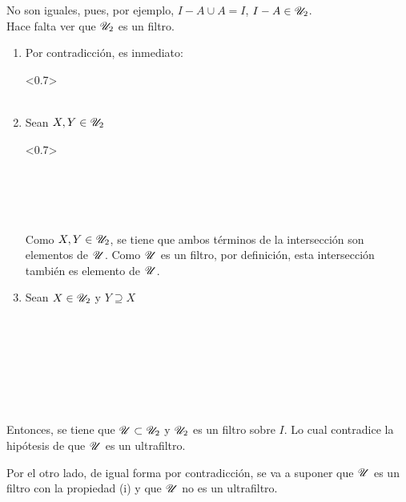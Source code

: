 \begin{demo}[i]
  No son iguales, pues, por ejemplo, $I-A \cup A = I$, $I-A \in \mathscr{U}_2$.\\
  Hace falta ver que $\mathscr{U}_2$ es un filtro.
  \begin{enumerate}
    \item Por contradicción, es inmediato:
          \begin{longderivation}<0.7>
              \\
            \equiv\\
          \end{longderivation}
    \item Sean $X, Y \in \mathscr{U}_2$
          \begin{longderivation}<0.7>
              \\
            \equiv\\
              \\
            \equiv\\
              \\
          \end{longderivation}
          Como $X,Y\in\mathscr{U}_2$, se tiene que ambos términos de la intersección
          son elementos de $\mathscr{U}$. Como $\mathscr{U}$ es un filtro, por definición, esta
          intersección también es elemento de $\mathscr{U}$.
    \item Sean $X\in\mathscr{U}_2$ y $Y\supseteq X$
          \begin{longderivation}
              \\
            \To\\
              \\
            \\
              \\
            \equiv\\
          \end{longderivation}
  \end{enumerate}

  Entonces, se tiene que $\mathscr{U} \subset \mathscr{U}_2$ y $\mathscr{U}_2$ es un filtro sobre
  $I$. Lo cual contradice la hipótesis de que $\mathscr{U}$ es un ultrafiltro.

  Por el otro lado, de igual forma por contradicción, se va a suponer que
  $\mathscr{U}$ es un filtro con la propiedad (i) y que $\mathscr{U}$ no es un ultrafiltro.


\end{demo}
